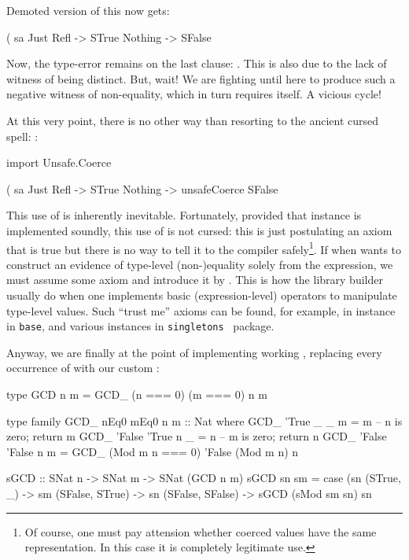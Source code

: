\documentclass[demotion-paper.tex]{subfiles}
\begin{document}
Demoted version of this now gets:

\begin{code}
(%
sa %
  Just Refl -> STrue
  Nothing -> SFalse  
\end{code}

Now, the type-error remains on the last clause: .
This is also due to the lack of witness of being distinct.
But, wait! We are fighting until here to produce such a negative witness of non-equality, which in turn requires itself. A vicious cycle!

At this very point, there is no other way than resorting to the ancient cursed spell: :

\begin{code}
import Unsafe.Coerce

(%
sa %
  Just Refl -> STrue
  Nothing -> unsafeCoerce SFalse  
\end{code}

This use of  is inherently inevitable.
Fortunately, provided that  instance is implemented soundly, this use of  is not cursed: this is just postulating an axiom that is true but there is no way to tell it to the compiler safely\footnote{Of course, one must pay attension whether coerced values have the same representation. In this case it is completely legitimate use.}.
If when wants to construct an evidence of type-level (non-)equality solely from the expression, we must assume some axiom and introduce it by .
This is how the library builder usually do when one implements basic (expression-level) operators to manipulate type-level values.
Such ``trust me'' axioms can be found, for example, in  instance in \texttt{base}, and various  instances in \texttt{singletons}~\cite{singletons} package.

Anyway, we are finally at the point of implementing working , replacing every occurrence of \hask{(==)} with our custom \hask{(===)}:

\begin{code}
type GCD n m = GCD_ (n === 0) (m === 0) n m

type family GCD_ nEq0 mEq0 n m :: Nat where
  GCD_ 'True  _      _ m = m -- n is zero; return m
  GCD_ 'False 'True  n _ = n -- m is zero; return n
  GCD_ 'False 'False n m = GCD_ (Mod m n === 0) 'False (Mod m n) n

sGCD :: SNat n -> SNat m -> SNat (GCD n m)
sGCD sn sm = case (sn %
  (STrue, _) -> sm
  (SFalse, STrue) -> sn
  (SFalse, SFalse) -> sGCD (sMod sm sn) sn
\end{code}
\end{document}

